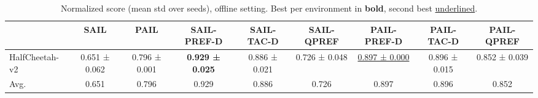 \begin{table}[t]
\centering
\small
\begin{table}
\caption{Normalized score (mean \pm std over seeds), offline setting. Best per environment in \textbf{{bold}}, second best \underline{{underlined}}.}
\label{tab:main_offline}
\begin{tabular}{lcccccccc}
\toprule
 & SAIL & PAIL & SAIL-PREF-D & SAIL-TAC-D & SAIL-QPREF & PAIL-PREF-D & PAIL-TAC-D & PAIL-QPREF \\
\midrule
HalfCheetah-v2 & 0.651 ± 0.062 & 0.796 ± 0.001 & \textbf{0.929 ± 0.025} & 0.886 ± 0.021 & 0.726 ± 0.048 & \underline{0.897 ± 0.000} & 0.896 ± 0.015 & 0.852 ± 0.039 \\
Avg. & 0.651 & 0.796 & 0.929 & 0.886 & 0.726 & 0.897 & 0.896 & 0.852 \\
\bottomrule
\end{tabular}
\end{table}
\end{table}
